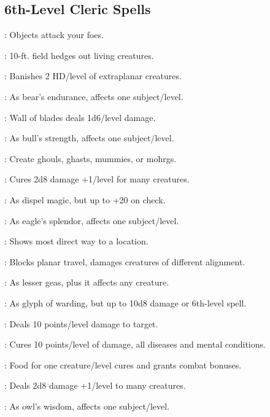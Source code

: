 \begin{multicols}{2}
\subsection{6th-Level Cleric Spells}
\begin{description*}
\item[\linkspell{Animate Objects}:] Objects attack your foes.
\item[\linkspell{Antilife Shell}:] 10-ft. field hedges out living creatures.
\item[\linkspell{Banishment}:] Banishes 2 HD/level of extraplanar creatures.
\item[\linkspell{Bear’s Endurance, Mass}:] As bear’s endurance, affects one subject/level.
\item[\linkspell{Blade Barrier}:] Wall of blades deals 1d6/level damage.
\item[\linkspell{Bull’s Strength, Mass}:] As bull’s strength, affects one subject/level.
\item[\linkspell{Create Undead}:] Create ghouls, ghasts, mummies, or mohrgs.
\item[\linkspell{Cure Moderate Wounds, Mass}:] Cures 2d8 damage +1/level for many creatures.
\item[\linkspell{Dispel Magic, Greater}:] As dispel magic, but up to +20 on check.
\item[\linkspell{Eagle’s Splendor, Mass}:] As eagle’s splendor, affects one subject/level.
\item[\linkspell{Find the Path}:] Shows most direct way to a location.
\item[\linkspell{Forbiddance}:] Blocks planar travel, damages creatures of different alignment.
\item[\linkspell{Geas/Quest}:] As lesser geas, plus it affects any creature.
\item[\linkspell{Glyph of Warding, Greater}:] As glyph of warding, but up to 10d8 damage or 6th-level spell.
\item[\linkspell{Harm}:] Deals 10 points/level damage to target.
\item[\linkspell{Heal}:] Cures 10 points/level of damage, all diseases and mental conditions.
\item[\linkspell{Heroes’ Feast}:] Food for one creature/level cures and grants combat bonuses.
\item[\linkspell{Inflict Moderate Wounds, Mass}:] Deals 2d8 damage +1/level to many creatures.
\item[\linkspell{Owl’s Wisdom, Mass}:] As owl’s wisdom, affects one subject/level.

\end{description*}
\end{multicols}
